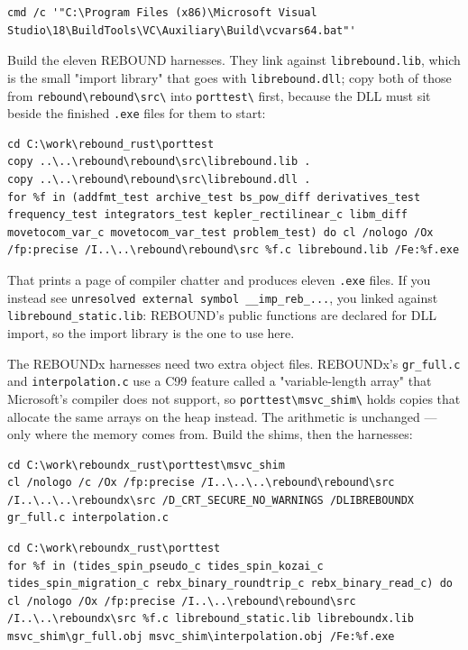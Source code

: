 \documentclass[11pt]{article}
\begin{document}
\begin{lstlisting}
cmd /c '"C:\Program Files (x86)\Microsoft Visual Studio\18\BuildTools\VC\Auxiliary\Build\vcvars64.bat"'
\end{lstlisting}

Build the eleven REBOUND harnesses. They link against \texttt{librebound.lib}, which is the small "import library" that goes with \texttt{librebound.dll}; copy both of those from \texttt{rebound\textbackslash{}rebound\textbackslash{}src\textbackslash{}} into \texttt{porttest\textbackslash{}} first, because the DLL must sit beside the finished \texttt{.exe} files for them to start:

\begin{lstlisting}
cd C:\work\rebound_rust\porttest
copy ..\..\rebound\rebound\src\librebound.lib .
copy ..\..\rebound\rebound\src\librebound.dll .
for %f in (addfmt_test archive_test bs_pow_diff derivatives_test frequency_test integrators_test kepler_rectilinear_c libm_diff movetocom_var_c movetocom_var_test problem_test) do cl /nologo /Ox /fp:precise /I..\..\rebound\rebound\src %f.c librebound.lib /Fe:%f.exe
\end{lstlisting}

That prints a page of compiler chatter and produces eleven \texttt{.exe} files. If you instead see \texttt{unresolved external symbol \_\_imp\_reb\_...}, you linked against \texttt{librebound\_static.lib}: REBOUND's public functions are declared for DLL import, so the import library is the one to use here.

The REBOUNDx harnesses need two extra object files. REBOUNDx's \texttt{gr\_full.c} and \texttt{interpolation.c} use a C99 feature called a "variable-length array" that Microsoft's compiler does not support, so \texttt{porttest\textbackslash{}msvc\_shim\textbackslash{}} holds copies that allocate the same arrays on the heap instead. The arithmetic is unchanged --- only where the memory comes from. Build the shims, then the harnesses:

\begin{lstlisting}
cd C:\work\reboundx_rust\porttest\msvc_shim
cl /nologo /c /Ox /fp:precise /I..\..\..\rebound\rebound\src /I..\..\..\reboundx\src /D_CRT_SECURE_NO_WARNINGS /DLIBREBOUNDX gr_full.c interpolation.c
\end{lstlisting}

\begin{lstlisting}
cd C:\work\reboundx_rust\porttest
for %f in (tides_spin_pseudo_c tides_spin_kozai_c tides_spin_migration_c rebx_binary_roundtrip_c rebx_binary_read_c) do cl /nologo /Ox /fp:precise /I..\..\rebound\rebound\src /I..\..\reboundx\src %f.c librebound_static.lib libreboundx.lib msvc_shim\gr_full.obj msvc_shim\interpolation.obj /Fe:%f.exe
\end{lstlisting}
\end{document}
